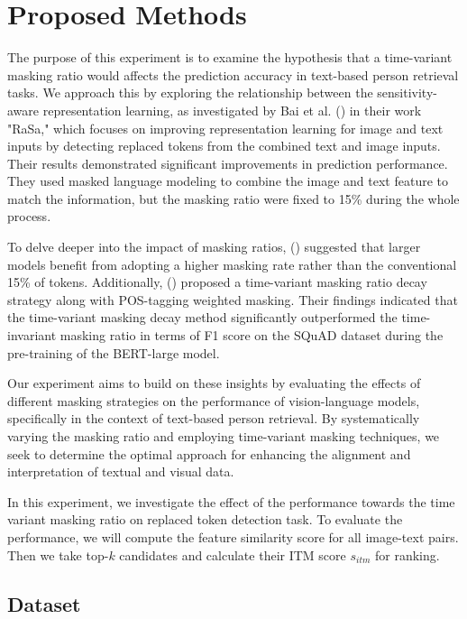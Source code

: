 \chapter{Proposed Methods}

The purpose of this experiment is to examine the hypothesis that a time-variant masking ratio would affects the prediction accuracy in text-based person retrieval tasks. We approach this by exploring the relationship between the sensitivity-aware representation learning, as investigated by Bai et al. (\cite{Bai2023RaSaRA}) in their work "RaSa," which focuses on improving representation learning for image and text inputs by detecting replaced tokens from the combined text and image inputs. Their results demonstrated significant improvements in prediction performance. They used masked language modeling to combine the image and text feature to match the information, but the masking ratio were fixed to 15\% during the whole process.

To delve deeper into the impact of masking ratios, (\cite{wettig-etal-2023-mask}) suggested that larger models benefit from adopting a higher masking rate rather than the  conventional 15\% of tokens. Additionally, (\cite{yang2023learningbettermaskingbetter}) proposed a time-variant masking ratio decay strategy along with POS-tagging weighted masking. Their findings indicated that the time-variant masking decay method significantly outperformed the time-invariant masking ratio in terms of F1 score on the SQuAD dataset during the pre-training of the BERT-large model.

Our experiment aims to build on these insights by evaluating the effects of different masking strategies on the performance of vision-language models, specifically in the context of text-based person retrieval. By systematically varying the masking ratio and employing time-variant masking techniques, we seek to determine the optimal approach for enhancing the alignment and interpretation of textual and visual data.

In this experiment, we investigate the effect of the performance towards the time variant masking ratio on replaced token detection task. To evaluate the performance, we will compute the feature similarity score for all image-text pairs. Then we take top-$k$ candidates and calculate their ITM score $s_{itm}$ for ranking. 

\section{Dataset}

